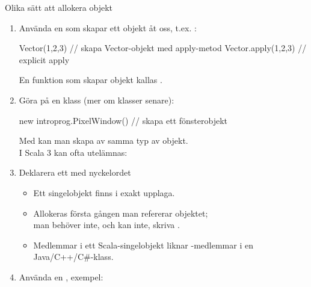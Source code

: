 \begin{Slide}{Olika sätt att allokera objekt}\SlideFontSmall
\begin{enumerate}

\item Använda en  som skapar ett objekt åt oss, t.ex. :
\begin{Code}
Vector(1,2,3)  // skapa Vector-objekt med apply-metod
Vector.apply(1,2,3)  // explicit apply
\end{Code}
{\SlideFontTiny En funktion som skapar objekt kallas  .\vspace{0.5em}}

\item Göra  på en klass (mer om klasser senare):
\begin{Code}
new introprog.PixelWindow() // skapa ett fönsterobjekt
\end{Code}
{
\SlideFontSmall Med  kan man skapa  av samma typ av objekt.\\
I Scala 3 kan  ofta utelämnas: 
}

\item Deklarera ett  med nyckelordet 
\begin{itemize}\SlideFontSmall
  \item Ett singelobjekt finns i exakt  upplaga.
  \item Allokeras  första gången man refererar objektet; \\
  man behöver inte, och kan inte, skriva .
  \pause
  \item Medlemmar i ett Scala-singelobjekt liknar -medlemmar i en Java/C++/C\#-klass.
\end{itemize}
\item Använda en , exempel: 
\end{enumerate}
\end{Slide}


